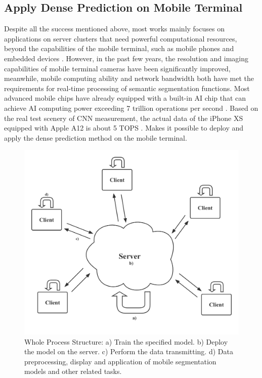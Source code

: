 \subsection{Apply Dense Prediction on Mobile Terminal} 

Despite all the success mentioned above, most works mainly focuses on applications on server clusters that need powerful computational resources, beyond the capabilities of the mobile terminal, such as mobile phones and embedded devices \cite{zhang2022topformer}. However, in the past few years, the resolution and imaging capabilities of mobile terminal cameras have been significantly improved, meanwhile, mobile computing ability and network bandwidth both have met the requirements for real-time processing of semantic segmentation functions. Most advanced mobile chips have already equipped with a built-in AI chip that can achieve AI computing power exceeding 7 trillion operations per second \cite{qualcommdoc}. Based on the real test scenery of CNN measurement, the actual data of the iPhone XS equipped with Apple A12 is about 5 TOPS \cite{apple}. Makes it possible to deploy and apply the dense prediction method on the mobile terminal. 


\begin{figure}[htb]
    \centering
    \includegraphics[width=1\textwidth]{figures/ServerClientModule.png}
    \caption{Whole Process Structure: a) Train the specified model. b) Deploy the model on the server. c) Perform the data transmitting. d) Data preprocessing, display and application of mobile segmentation models and other related tasks.}\label{ServerClientModule}
\end{figure}

